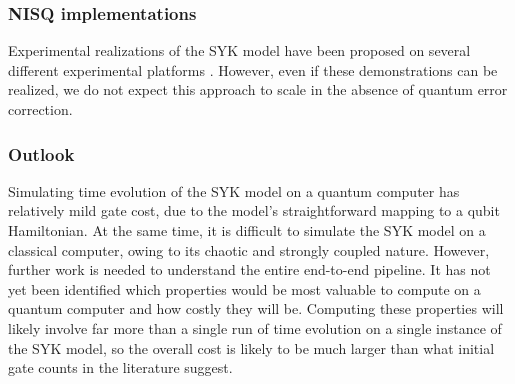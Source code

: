 \begin{refsection}
\subsubsection*{NISQ implementations}

Experimental realizations of the SYK model have been proposed on several different experimental platforms \cite{franz2018mimicing,rahmani2019interactingMajoranaFermions,luo2019SYK_with_NMR}.
However, even if these demonstrations can be realized, we do not expect this approach to scale in the absence of quantum error correction.


\subsubsection*{Outlook}
Simulating time evolution of the SYK model on a quantum computer has relatively mild gate cost, due to the model's straightforward mapping to a qubit Hamiltonian. At the same time, it is difficult to simulate the SYK model on a classical computer, owing to its chaotic and strongly coupled nature. However, further work is needed to understand the entire end-to-end pipeline. It has not yet been identified which properties would be most valuable to compute on a quantum computer and how costly they will be. Computing these properties will likely involve far more than a single run of time evolution on a single instance of the SYK model, so the overall cost is likely to be much larger than what initial gate counts in the literature suggest. 

\printbibliography[heading=secbib,segment=\therefsegment]
\end{refsection}



\newpage






